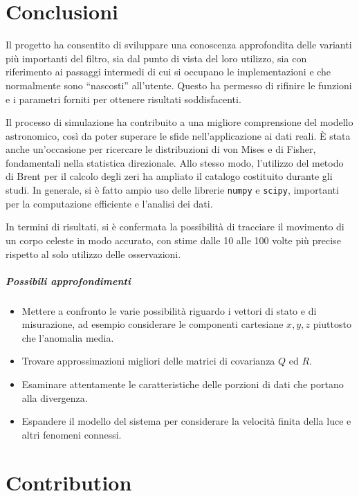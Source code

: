 \documentclass[12pt,a4paper,openright,twoside]{book}
\begin{document}
\chapter{Conclusioni}

Il progetto ha consentito di sviluppare una conoscenza approfondita delle varianti più importanti del filtro, sia dal punto di vista del loro utilizzo, sia con riferimento ai passaggi intermedi di cui si occupano le implementazioni e che normalmente sono ``nascosti'' all'utente. Questo ha permesso di rifinire le funzioni e i parametri forniti per ottenere risultati soddisfacenti.

Il processo di simulazione ha contribuito a una migliore comprensione del modello astronomico, così da poter superare le sfide nell'applicazione ai dati reali. È stata anche un'occasione per ricercare le distribuzioni di von Mises e di Fisher, fondamentali nella statistica direzionale. Allo stesso modo, l'utilizzo del metodo di Brent per il calcolo degli zeri ha ampliato il catalogo costituito durante gli studi. In generale, si è fatto ampio uso delle librerie \lstinline{numpy} e \lstinline{scipy}, importanti per la computazione efficiente e l'analisi dei dati.

In termini di risultati, si è confermata la possibilità di tracciare il movimento di un corpo celeste in modo accurato, con stime dalle 10 alle 100 volte più precise rispetto al solo utilizzo delle osservazioni.

\paragraph{Possibili approfondimenti}

\begin{itemize}
\item Mettere a confronto le varie possibilità riguardo i vettori di stato e di misurazione, ad esempio considerare le componenti cartesiane $x,y,z$ piuttosto che l'anomalia media.
\item Trovare approssimazioni migliori delle matrici di covarianza $Q$ ed $R$.
\item Esaminare attentamente le caratteristiche delle porzioni di dati che portano alla divergenza.
\item Espandere il modello del sistema per considerare la velocità finita della luce e altri fenomeni connessi.
\end{itemize}

\iffalse %
\chapter{Contribution}
\end{document}

